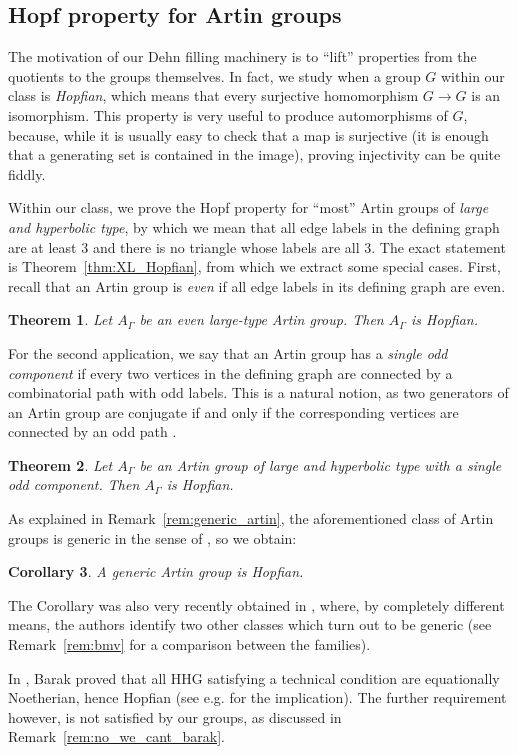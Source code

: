 \documentclass[svgnames]{amsart}
\theoremstyle{plain}
\newtheorem{thmintro}{Theorem}
\newtheorem{corintro}[thmintro]{Corollary}
\theoremstyle{definition}
\begin{document}
\subsection*{Hopf property for Artin groups}
The motivation of our Dehn filling machinery is to “lift” properties from the quotients to the groups themselves. In fact, we study when a group $G$ within our class is \emph{Hopfian}, which means that every surjective homomorphism $G\to G$ is an isomorphism. This property is very useful to produce automorphisms of $G$, because, while it is usually easy to check that a map is surjective (it is enough that a generating set is contained in the image), proving injectivity can be quite fiddly.


Within our class, we prove the Hopf property for “most” Artin groups of \emph{large and hyperbolic type}, by which we mean that all edge labels in the defining graph are at least $3$ and there is no triangle whose labels are all $3$. The exact statement is Theorem~\ref{thm:XL_Hopfian}, from which we extract some special cases. First, recall that an Artin group is \emph{even} if all edge labels in its defining graph are even. 

\begin{thmintro}\label{thmintro:even_hopf}
    Let $A_\Gamma$ be an even large-type Artin group. Then $A_\Gamma$ is Hopfian.
\end{thmintro}

For the second application, we say that an Artin group has a \emph{single odd component} if every two vertices in the defining graph are connected by a combinatorial path with odd labels. This is a natural notion, as two generators of an Artin group are conjugate if and only if the corresponding vertices are connected by an odd path \cite{paris_artin_groups}. 

\begin{thmintro}\label{thmintro:odd_hopf}
    Let $A_\Gamma$ be an Artin group of large and hyperbolic type with a single odd component. Then $A_\Gamma$ is Hopfian.
\end{thmintro}

As explained in Remark~\ref{rem:generic_artin}, the aforementioned class of Artin groups is generic in the sense of \cite{GV_random}, so we obtain:

\begin{corintro}\label{corintro:generic}
    A generic Artin group is Hopfian.
\end{corintro}

The Corollary was also very recently obtained in \cite{BMV}, where, by completely different means, the authors identify two other classes which turn out to be generic (see Remark~\ref{rem:bmv} for a comparison between the families).
\par\medskip
In \cite{barak2024equational}, Barak proved that all HHG satisfying a technical condition are equationally Noetherian, hence Hopfian (see e.g. \cite[Corollary 3.14 and Theorem D]{Groves_Hull:eq_noetherian} for the implication). The further requirement however, is not satisfied by our groups, as discussed in Remark~\ref{rem:no_we_cant_barak}.
\end{document}
